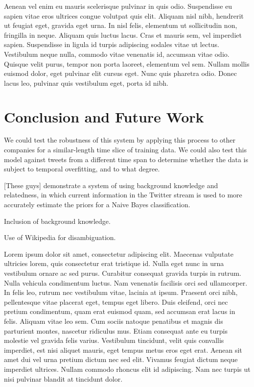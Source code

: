 \documentclass[letterpaper]{article}
\begin{document}
Aenean vel enim eu mauris scelerisque pulvinar in quis odio. Suspendisse eu sapien vitae eros ultrices congue volutpat quis elit. Aliquam nisl nibh, hendrerit ut feugiat eget, gravida eget urna. In nisl felis, elementum ut sollicitudin non, fringilla in neque. Aliquam quis luctus lacus. Cras et mauris sem, vel imperdiet sapien. Suspendisse in ligula id turpis adipiscing sodales vitae ut lectus. Vestibulum neque nulla, commodo vitae venenatis id, accumsan vitae odio. Quisque velit purus, tempor non porta laoreet, elementum vel sem. Nullam mollis euismod dolor, eget pulvinar elit cursus eget. Nunc quis pharetra odio. Donec lacus leo, pulvinar quis vestibulum eget, porta id nibh.


\section{Conclusion and Future Work}

We could test the robustness of this system by applying this process to other companies for a similar-length time slice of training data. We could also test this model against tweets from a different time span to determine whether the data is subject to temporal overfitting, and to what degree.

[These guys] demonstrate a system of using background knowledge and relatedness, in which current information in the Twitter stream is used to more accurately estimate the priors for a Naive Bayes classification.

Inclusion of background knowledge.

Use of Wikipedia for disambiguation.


Lorem ipsum dolor sit amet, consectetur adipiscing elit. Maecenas vulputate ultricies lorem, quis consectetur erat tristique id. Nulla eget nunc in urna vestibulum ornare ac sed purus. Curabitur consequat gravida turpis in rutrum. Nulla vehicula condimentum luctus. Nam venenatis facilisis orci sed ullamcorper. In felis leo, rutrum nec vestibulum vitae, lacinia at ipsum. Praesent orci nibh, pellentesque vitae placerat eget, tempus eget libero. Duis eleifend, orci nec pretium condimentum, quam erat euismod quam, sed accumsan erat lacus in felis. Aliquam vitae leo sem. Cum sociis natoque penatibus et magnis dis parturient montes, nascetur ridiculus mus. Etiam consequat ante eu turpis molestie vel gravida felis varius. Vestibulum tincidunt, velit quis convallis imperdiet, est nisi aliquet mauris, eget tempus metus eros eget erat. Aenean sit amet dui vel urna pretium dictum nec sed elit. Vivamus feugiat dictum neque imperdiet ultrices. Nullam commodo rhoncus elit id adipiscing. Nam nec turpis ut nisi pulvinar blandit at tincidunt dolor.
\end{document}
